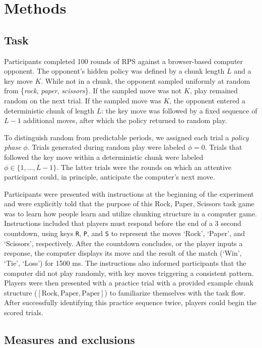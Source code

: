 \documentclass[11pt]{article}
\begin{document}
\section{Methods}

\subsection{Task}

Participants completed 100 rounds of RPS against a browser-based computer opponent. The opponent's hidden policy was defined by a chunk length $L$ and a key move $K$. While not in a chunk, the opponent sampled uniformly at random from \{\emph{rock}, \emph{paper}, \emph{scissors}\}. If the sampled move was not $K$, play remained random on the next trial. If the sampled move was $K$, the opponent entered a deterministic chunk of length $L$: the key move was followed by a fixed sequence of $L-1$ additional moves, after which the policy returned to random play.

To distinguish random from predictable periods, we assigned each trial a \emph{policy phase} $\phi$. Trials generated during random play were labeled $\phi = 0$. Trials that followed the key move within a deterministic chunk were labeled $\phi \in \{1,\ldots,L-1\}$. The latter trials were the rounds on which an attentive participant could, in principle, anticipate the computer's next move.

Participants were presented with instructions at the beginning of the experiment and were explicitly told that the purpose of this Rock, Paper, Scissors task game was to learn how people learn and utilize chunking structure in a computer game. Instructions included that players must respond before the end of a 3 second countdown, using keys \texttt{R}, \texttt{P}, and \texttt{S} to represent the moves `Rock', `Paper', and `Scissors', respectively. After the countdown concludes, or the player inputs a response, the computer displays its move and the result of the match (`Win', `Tie', `Loss') for 1500 ms. The instructions also informed participants that the computer did not play randomly, with key moves triggering a consistent pattern. Players were then presented with a practice trial with a provided example chunk structure ($[\text{Rock}, \text{Paper}, \text{Paper}]$) to familiarize themselves with the task flow. After successfully identifying this practice sequence twice, players could begin the scored trials. 


\subsection{Measures and exclusions}
\end{document}
